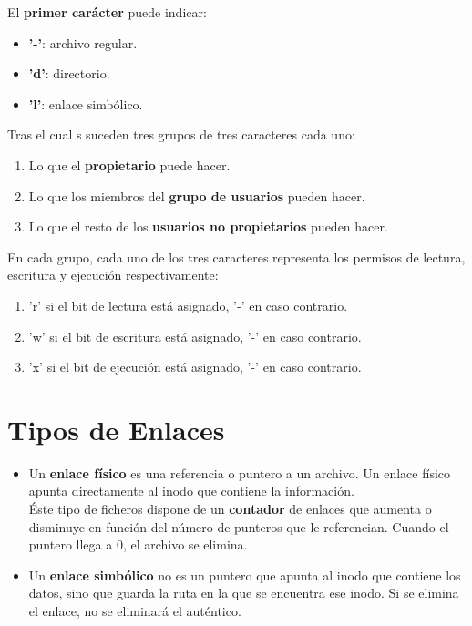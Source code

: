 El \textbf{primer carácter} puede indicar:
\begin{itemize}
    \item \textbf{'-'}: archivo regular.
    \item \textbf{'d'}:	directorio.
    \item \textbf{'l'}:	enlace simbólico.
\end{itemize}
Tras el cual s suceden tres grupos de tres caracteres cada uno:
\begin{enumerate}
    \item Lo que el \textbf{propietario} puede hacer.
    \item Lo que los miembros del \textbf{grupo de usuarios} pueden hacer.
    \item Lo que el resto de los \textbf{usuarios no propietarios} pueden hacer.
\end{enumerate}
En cada grupo, cada uno de los tres caracteres representa los permisos de lectura, escritura y ejecución respectivamente:
\begin{enumerate}
    \item 'r' si el bit de lectura está asignado, '-' en caso contrario.
    \item 'w' si el bit de escritura está asignado, '-' en caso contrario.
    \item 'x' si el bit de ejecución está asignado, '-' en caso contrario.
\end{enumerate}

\section{Tipos de Enlaces}
\begin{itemize}
    \item Un \textbf{enlace físico} es una referencia o puntero a un archivo. Un enlace físico apunta directamente al inodo que contiene la información.\\
    
    Éste tipo de ficheros dispone de un \textbf{contador} de enlaces que aumenta o disminuye en función del número de punteros que le referencian. Cuando el puntero llega a 0, el archivo se elimina.
    
    \item Un \textbf{enlace simbólico} no es un puntero que apunta al inodo que contiene los datos, sino que guarda la ruta en la que se encuentra ese inodo. Si se elimina el enlace, no se eliminará el auténtico.
\end{itemize}

